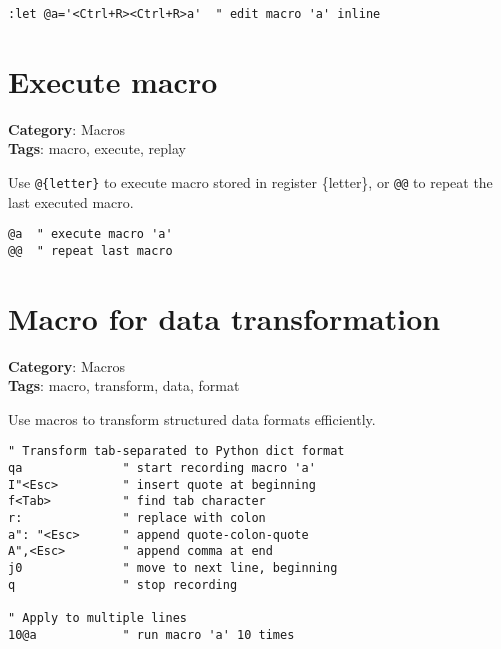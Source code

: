 {{{{{{{\begin{Exa*}{}
\begin{Verbatim}[fontsize=\footnotesize, breaklines, breakanywhere]
:let @a='<Ctrl+R><Ctrl+R>a'  " edit macro 'a' inline
\end{Verbatim}
\end{Exa*}

\section{Execute macro}

\textbf{Category}: Macros\\ \textbf{Tags}: macro, execute, replay
\vspace{0.5cm}

Use {\footnotesize \Verb§@{letter}§} to execute macro stored in register \{letter\}, or {\footnotesize \Verb§@@§} to repeat the last executed macro.

\begin{Exa*}{}
\begin{Verbatim}[fontsize=\footnotesize, breaklines, breakanywhere]
@a  " execute macro 'a'
@@  " repeat last macro
\end{Verbatim}
\end{Exa*}

\section{Macro for data transformation}

\textbf{Category}: Macros\\ \textbf{Tags}: macro, transform, data, format
\vspace{0.5cm}

Use macros to transform structured data formats efficiently.

\begin{Exa*}{}
\begin{Verbatim}[fontsize=\footnotesize, breaklines, breakanywhere]
" Transform tab-separated to Python dict format
qa              " start recording macro 'a'
I"<Esc>         " insert quote at beginning
f<Tab>          " find tab character
r:              " replace with colon
a": "<Esc>      " append quote-colon-quote
A",<Esc>        " append comma at end
j0              " move to next line, beginning
q               " stop recording

" Apply to multiple lines
10@a            " run macro 'a' 10 times
\end{Verbatim}
\end{Exa*}

}}}}}}}
